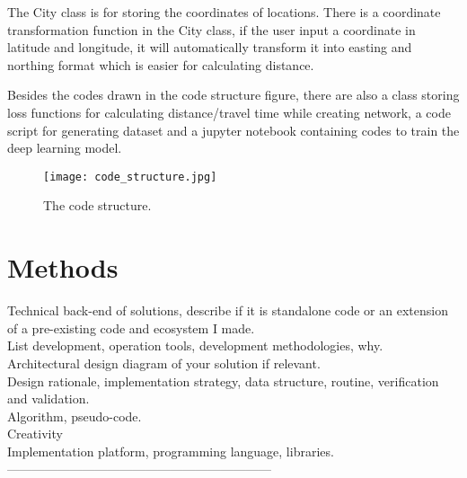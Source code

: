 \documentclass[final-report]{report-template}
\begin{document}
The City class is for storing the coordinates of locations. There is a coordinate transformation function in the City class, 
if the user input a coordinate in latitude and longitude, it will automatically transform it into easting and northing format 
which is easier for calculating distance.

Besides the codes drawn in the code structure figure, 
there are also a class storing loss functions for calculating distance/travel time while creating network,
a code script for generating dataset and a jupyter notebook containing codes to train the deep learning model.



\begin{figure}[H]
    \begin{center}
        \texttt{[image: code\_structure.jpg]}
    \end{center}
    \caption{\label{fig:code_struc} The code structure.}
\end{figure}

\section {Methods}
Technical back-end of solutions, describe if it is standalone code or an extension of a pre-existing code and ecosystem I made.\\
List development, operation tools, development methodologies, why.\\
Architectural design diagram of your solution if relevant.\\
Design rationale, implementation strategy, data structure, routine, verification and validation.\\
Algorithm, pseudo-code.\\
Creativity\\
Implementation platform, programming language, libraries.\\

---------------------------------------------------------------\\
\end{document}
